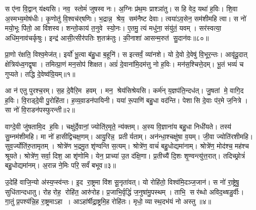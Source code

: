 स ए॑ना वि॒द्वान् य॑क्ष्यसि।
नव॒ स्तोमं॑ जुषस्व नः।
अ॒ग्निः प्र॑थ॒मः प्राश्ञा॑तु।
स हि वेद॒ यथा॑ ह॒विः।
शि॒वा अ॒स्मभ्य॒मोष॑धीः।
कृ॒णोतु॑ वि॒श्वच॑र्‌षणिः।
भ॒द्रान्न॒ श्रेय॒ सम॑नैष्ट देवाः।
त्वया॑ऽव॒सेन॒ सम॑शीमहि त्वा।
स नो॑ मयो॒भूः पि॑तो॒ आ वि॑शस्व।
शन्तो॒काय॑ त॒नुवे स्यो॒नः।
ए॒तमु॒ त्यं मधु॑ना॒ संयु॑तं॒ यवम्।
सर॑स्वत्या॒ अधि॑म॒नाव॑चर्कृषुः।
इन्द्र॑ आसी॒त्सीर॑पतिः श॒तक्र॑तुः।
की॒नाशा॑ आसन्म॒रुत॑ सु॒दान॑वः॥८०॥\anuvakamend[पु॒र॒ए॒ता वृ॑णीमहे जु॒षेथान्तर्पयता॒मृत॒न्नवे॑न मीयसे स्यो॒नश्च॒त्वारि॑ च]




\clearpage
{}
\setcounter{anuvakam}{0}

प्रा॒णो र॑क्षति॒ विश्व॒मेज॑त्।
इर्यो॑ भू॒त्वा ब॑हु॒धा ब॒हूनि॑।
स इत्सर्वं॒ व्या॑नशे।
यो दे॒वो दे॒वेषु॑ वि॒भूर॒न्तः।
आवृ॑दू॒दात् क्षेत्रिय॑ध्व॒गद्वृषा।
तमित्प्रा॒णं मन॒सोप॑ शिक्षत।
अग्रं॑ दे॒वाना॑मि॒दम॑त्तु नो ह॒विः।
मन॑स॒श्चित्ते॒दम्।
भू॒तं भव्यं॑ च गुप्यते।
तद्धि दे॒वेष्व॑ग्रि॒यम्॥१॥

आ न॑ एतु पुरश्च॒रम्।
स॒ह दे॒वैरि॒म हवम्।
मन॒ श्रेय॑सिश्रेयसि।
कर्म॑न् य॒ज्ञप॑ति॒न्दध॑त्।
जु॒षतां मे॒ वागि॒द ह॒विः।
वि॒राड्दे॒वी पु॒रोहि॑ता।
ह॒व्य॒वा़डन॑पायिनी।
यया॑ रू॒पाणि॑ बहु॒धा वद॑न्ति।
पेशासि दे॒वाः प॑र॒मे ज॒नित्रे।
सा नो॑ वि॒राडन॑पस्फुरन्ती॥२॥

वाग्दे॒वी जु॑षतामि॒द ह॒विः।
चक्षु॑र्दे॒वानां॒ ज्योति॑र॒मृते॒ न्य॑क्तम्।
अ॒स्य वि॒ज्ञाना॑य बहु॒धा निधी॑यते।
तस्य॑ सु॒म्नम॑शीमहि।
मा नो॑ हासीद्विचक्ष॒णम्।
आयु॒रिन्न॒ प्रतीर्यताम्।
अन॑न्धा॒श्चक्षु॑षा व॒यम्।
जी॒वा ज्योति॑रशीमहि।
सुव॒र्ज्योति॑रु॒तामृतम्।
श्रोत्रे॑ण भ॒द्रमु॒त शृ॑ण्वन्ति स॒त्यम्।
श्रोत्रे॑ण॒ वाचं॑ बहु॒धोद्यमा॑नाम्।
श्रोत्रे॑ण॒ मोद॑श्च॒ मह॑श्च श्रूयते।
श्रोत्रे॑ण॒ सर्वा॒ दिश॒ आ शृ॑णोमि।
येन॒ प्राच्या॑ उ॒त द॑क्षि॒णा।
प्र॒तीच्यै॑ दि॒शः शृ॒ण्वन्त्यु॑त्त॒रात्।
तदिच्छ्रोत्रं॑ बहु॒धोद्यमा॑नम्।
अ॒रान्न ने॒मिः परि॒ सर्वं॑ बभूव॥३॥\anuvakamend[अ॒ग्रि॒यमन॑पस्फुरन्ती स॒त्य स॒प्त च॑]

उ॒देहि॑ वाजि॒न्यो अ॑स्य॒प्स्व॑न्तः।
इ॒द रा॒ष्ट्रमा वि॑श सू॒नृता॑वत्।
यो रोहि॑तो॒ विश्व॑मि॒दञ्ज॒जान॑।
स नो॑ रा॒ष्ट्रेषु॒ सुधि॑तान्दधातु।
रोहरोह॒ रोहि॑त॒ आरु॑रोह।
प्र॒जाभि॒र्वृद्धिं॑ ज॒नुषा॑मु॒पस्थम्।
ताभि॒ सर॑ब्धो अविद॒थ्षडु॒र्वीः।
गा॒तुं प्र॒पश्य॑न्नि॒ह रा॒ष्ट्रमाऽहा।
आऽहा॑र्\mbox{}षीद्रा॒ष्ट्रमि॒ह रोहि॑तः।
मृधो॒ व्यास्थ॒दभ॑यं नो अस्तु ॥४॥

